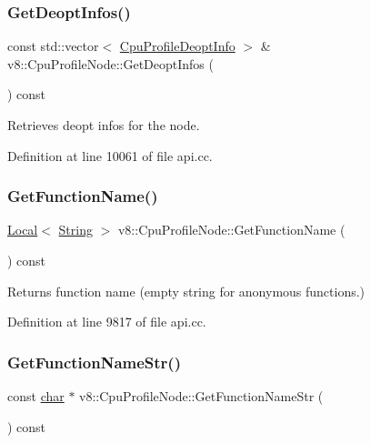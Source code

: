 \subsubsection{\texorpdfstring{Get\+Deopt\+Infos()}{GetDeoptInfos()}}
{\footnotesize\ttfamily const std\+::vector$<$ \mbox{\hyperlink{structv8_1_1CpuProfileDeoptInfo}{Cpu\+Profile\+Deopt\+Info}} $>$ \& v8\+::\+Cpu\+Profile\+Node\+::\+Get\+Deopt\+Infos (\begin{DoxyParamCaption}{ }\end{DoxyParamCaption}) const}

Retrieves deopt infos for the node. 

Definition at line 10061 of file api.\+cc.

\mbox{\label{classv8_1_1CpuProfileNode_aa47d4405b0d48d5b02f6f675a1fb6ec1}} 
\subsubsection{\texorpdfstring{Get\+Function\+Name()}{GetFunctionName()}}
{\footnotesize\ttfamily \mbox{\hyperlink{classv8_1_1Local}{Local}}$<$ \mbox{\hyperlink{classv8_1_1String}{String}} $>$ v8\+::\+Cpu\+Profile\+Node\+::\+Get\+Function\+Name (\begin{DoxyParamCaption}{ }\end{DoxyParamCaption}) const}

Returns function name (empty string for anonymous functions.) 

Definition at line 9817 of file api.\+cc.

\mbox{\label{classv8_1_1CpuProfileNode_a72610abd44f019711321a99e6a38485f}} 
\subsubsection{\texorpdfstring{Get\+Function\+Name\+Str()}{GetFunctionNameStr()}}
{\footnotesize\ttfamily const \mbox{\hyperlink{classchar}{char}} $\ast$ v8\+::\+Cpu\+Profile\+Node\+::\+Get\+Function\+Name\+Str (\begin{DoxyParamCaption}{ }\end{DoxyParamCaption}) const}

